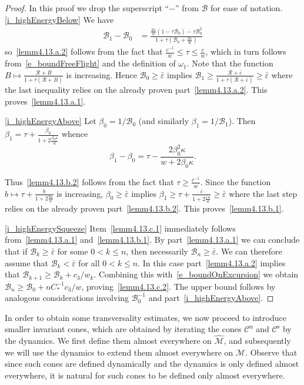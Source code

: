\documentclass[10pt]{amsart}
\theoremstyle{definition}\newtheorem{defi}[theo]{Definition}\newtheorem{rema}[theo]{Remark}\newtheorem{exam}[theo]{Example}\newtheorem{exem}[theo]{Example}\newtheorem{nota}[theo]{Notation}
\newcommand{\inv}{^{-1}}
\newcommand{\unstable}{\text{u}}
\newcommand{\stable}{\text{s}}
\newcommand{\ifrac}[2]{#1/#2}
\newcommand{\cB}{\mathcal{B}}
\newcommand{\cR}{\mathcal{R}}
\newcommand{\pslope}{\mathcal{B}}
\newcommand{\csp}{\mathcal{M}}
\newcommand{\cone}{\mathcal{C}}
\newcommand{\cspi}{\widehat{\csp}}
\newcommand{\breps}{\bar{\varepsilon}}
\newcommand{\coneu}{\cone^\unstable}
\newcommand{\cones}{\cone^\stable}
\newcommand{\ppPrivate}[2]{#1^{#2}}
\newcommand{\prePrivate}[1]{\ppPrivate{#1}{-}}
\newcommand{\prpslope}{\prePrivate{\pslope}}
\newcommand{\llw}{\stackunder[1.2pt]{$w$}{\rule{.8ex}{.075ex}}}
\newcommand{\law}[1]{\omega_{#1}}
\renewcommand{\prpslope}{\cB}
\renewcommand{\llw}{\law{1}}
\renewcommand{\prpslope}{\cB}
\renewcommand{\prpslope}{\cB}
\begin{document}
\begin{proof}
In this proof we drop the superscript ``$-$'' from $\cB$ for ease of notation. \eqref{i_highEnergyBelow} We have
\begin{align*}
\prpslope_{1}-\prpslope_{0} &=
\frac{\frac{{2}\kappa}{w}\left(1-\tau \prpslope_{0}\right)-\tau
\prpslope_{0}^2}{1+\tau\left(\prpslope_{0}+\frac{2\kappa}{w}\right)}
\end{align*}
so~\eqref{lemm4.13.a.2} follows from the fact that $\frac{c^{-1}}{w}\le\tau\le \frac{c}{w}$, which in turn follows from~\eqref{e_boundFreeFlight} and the definition of $\llw$. Note that the function $B\mapsto \frac{\cR+B}{1+\tau(\cR+B)}$ is increasing. Hence $\prpslope_{0}\geq\breps$ implies $\prpslope_{1}\geq
\frac{\cR+\breps}{1+\tau(\cR+\breps)}\geq\breps $ where the last inequality relies on the already proven part~\eqref{lemm4.13.a.2}. This proves~\eqref{lemm4.13.a.1}.

\eqref{i_highEnergyAbove} Let $\beta_{0}=1/\prpslope_{0}$ (and similarly $\beta_{1}=1/\prpslope_{1}$). Then $\beta_{1}=\tau+\frac{\beta_{0}}{1+2\frac{\beta_{0}
\kappa}{w}}$ whence
\[
\beta_{1}-\beta_{0} =
\tau-\frac{2{\beta_{0}^2 \kappa}}{w+2{\beta_{0} \kappa}}.
\]

Thus~\eqref{lemm4.13.b.2} follows from the fact that $\tau\ge \frac{c^{-1}}{w}$. Since the function $b\mapsto\tau+\frac{b}{1+2\frac{b \kappa}{w}}$ is increasing, $\beta_{0}\geq\breps$ implies $\beta_{1}\geq\tau+\frac{\breps}{1+2\frac{\breps
\kappa}{w}}\geq \breps$ where the last step relies on the already proven part~\eqref{lemm4.13.b.2}. This proves~\eqref{lemm4.13.b.1}.

\eqref{i_highEnergySqueeze} Item~\eqref{lemm4.13.c.1} immediately follows from~\eqref{lemm4.13.a.1} and~\eqref{lemm4.13.b.1}. By part~\eqref{lemm4.13.a.1} we can conclude that if $\prpslope_{k}\ge\breps$ for some $0 < k\le n$, then necessarily $\prpslope_{n}\ge\breps$. We can therefore assume that $\prpslope_{k} < \breps$ for all $0 < k \le n$. In this case part~\eqref{lemm4.13.a.2} implies that $\prpslope_{k+1}\ge\prpslope_{k}+\ifrac{c_3}{w_{k}}$. Combining this with~\eqref{e_boundOnExcursion} we obtain $\prpslope_{n}\ge\prpslope_{0}+\ifrac{n C_{*}^{-1}c_3}{w}$, proving~\eqref{lemm4.13.c.2}. The upper bound follows by analogous considerations involving $\prpslope_{0}\inv$ and part~\eqref{i_highEnergyAbove}.
\end{proof}

In order to obtain some transversality estimates, we now proceed to introduce smaller invariant cones, which are obtained by iterating the cones $\coneu$ and $\cones$ by the dynamics. We first define them almost everywhere on $\cspi$, and subsequently we will use the dynamics to extend them almost everywhere on $\csp$. Observe that since such cones are defined dynamically and the dynamics is only defined almost everywhere, it is natural for such cones to be defined only almost everywhere.
\end{document}
